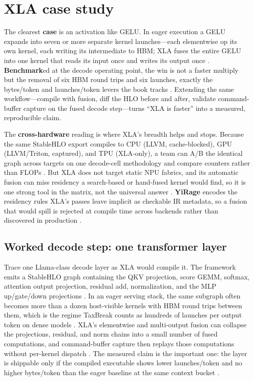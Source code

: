 \section{XLA case study}
\label{sec:ch15_xla_case_study}

The clearest \textbf{case} is an activation like GELU. In eager execution a GELU expands into seven or more separate kernel launches---each elementwise op its own kernel, each writing its intermediate to HBM; XLA fuses the entire GELU into one kernel that reads its input once and writes its output once \citep{openxla2024,taxbreak2026}. \textbf{Benchmark}ed at the decode operating point, the win is not a faster multiply but the removal of six HBM round trips and six launches, exactly the bytes/token and launches/token levers the book tracks \citep{memoryfloor2026,dao2022flashattention}. Extending the same workflow---compile with fusion, diff the HLO before and after, validate command-buffer capture on the fused decode step---turns ``XLA is faster'' into a measured, reproducible claim.

The \textbf{cross-hardware} reading is where XLA's breadth helps and stops. Because the same StableHLO export compiles to CPU (LLVM, cache-blocked), GPU (LLVM/Triton, captured), and TPU (XLA-only), a team can A/B the identical graph across targets on one decode-cell methodology and compare counters rather than FLOPs \citep{openxla2024,patel2025llminference}. But XLA does not target static NPU fabrics, and its automatic fusion can miss residency a search-based or hand-fused kernel would find, so it is one strong tool in the matrix, not the universal answer \citep{amd2024xdna,wu2024mirage}. \textbf{YiRage} encodes the residency rules XLA's passes leave implicit as checkable IR metadata, so a fusion that would spill is rejected at compile time across backends rather than discovered in production \citep{yirage2026}.

\subsection{Worked decode step: one transformer layer}

Trace one Llama-class decode layer as XLA would compile it. The framework emits a StableHLO graph containing the QKV projection, score GEMM, softmax, attention output projection, residual add, normalization, and the MLP up/gate/down projections \citep{dao2022flashattention,kwon2023vllm,patel2025llminference}. In an eager serving stack, the same subgraph often becomes more than a dozen host-visible kernels with HBM round trips between them, which is the regime TaxBreak counts as hundreds of launches per output token on dense models \citep{taxbreak2026,memoryfloor2026}. XLA's elementwise and multi-output fusion can collapse the projections, residual, and norm chains into a small number of fused computations, and command-buffer capture then replays those computations without per-kernel dispatch \citep{openxla2024,nvidia2024cudagraphs}. The measured claim is the important one: the layer is shippable only if the compiled executable shows lower launches/token and no higher bytes/token than the eager baseline at the same context bucket \citep{memoryfloor2026,patel2025llminference}.


